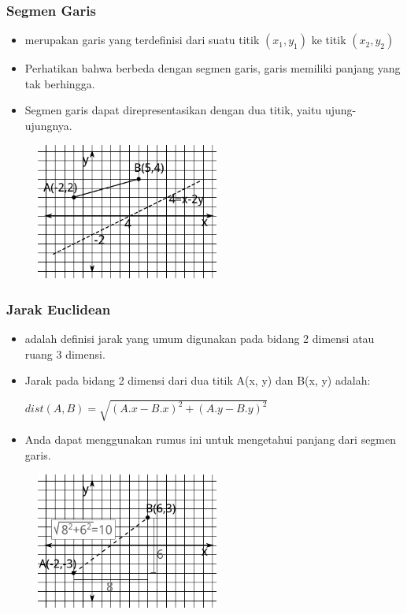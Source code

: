 \begin{frame}
\frametitle{Segmen Garis}
\begin{itemize}
  \item {} merupakan garis yang terdefinisi dari suatu titik $(x_1, y_1)$ ke titik $(x_2, y_2)$
  \item Perhatikan bahwa berbeda dengan segmen garis, garis memiliki panjang yang tak berhingga.
  \item Segmen garis dapat direpresentasikan dengan dua titik, yaitu ujung-ujungnya.
\end{itemize}
\begin{figure}
  \includegraphics[width=6cm]{asset/line-vs-line-segment.pdf}
\end{figure}
\end{frame}

\begin{frame}
\frametitle{Jarak Euclidean}
\begin{itemize}
  \item {} adalah definisi jarak yang umum digunakan pada bidang 2 dimensi atau ruang 3 dimensi.
  \item Jarak pada bidang 2 dimensi dari dua titik A(x, y) dan B(x, y) adalah:

  \(dist(A, B) = \sqrt{(A.x - B.x)^2 + (A.y - B.y)^2} \)
  \item Anda dapat menggunakan rumus ini untuk mengetahui panjang dari segmen garis.
\end{itemize}
\begin{figure}
  \includegraphics[width=6cm]{asset/euclidean.pdf}
\end{figure}
\end{frame}

